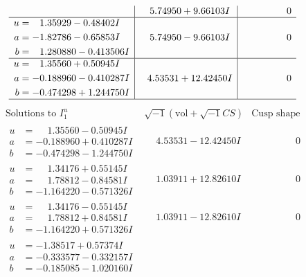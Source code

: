 \documentclass[1p]{elsarticle_modified}
\theoremstyle{definition}
\newcommand{\I}{\sqrt{-1}}
\begin{document}
$$\begin{array}{c|c|c}
 & \phantom{-}5.74950 + 9.66103 I & \phantom{-0.000000 } 0 \\ \hline\begin{aligned}
u &= \phantom{-}1.35929 - 0.48402 I \\
a &= -1.82786 - 0.65853 I \\
b &= \phantom{-}1.280880 - 0.413506 I\end{aligned}
 & \phantom{-}5.74950 - 9.66103 I & \phantom{-0.000000 } 0 \\ \hline\begin{aligned}
u &= \phantom{-}1.35560 + 0.50945 I \\
a &= -0.188960 - 0.410287 I \\
b &= -0.474298 + 1.244750 I\end{aligned}
 & \phantom{-}4.53531 + 12.42450 I & \phantom{-0.000000 } 0\\
 \hline 
 \end{array}$$\newpage$$\begin{array}{c|c|c}  
\text{Solutions to }I^u_{1}& \I (\text{vol} + \sqrt{-1}CS) & \text{Cusp shape}\\
 \hline 
\begin{aligned}
u &= \phantom{-}1.35560 - 0.50945 I \\
a &= -0.188960 + 0.410287 I \\
b &= -0.474298 - 1.244750 I\end{aligned}
 & \phantom{-}4.53531 - 12.42450 I & \phantom{-0.000000 } 0 \\ \hline\begin{aligned}
u &= \phantom{-}1.34176 + 0.55145 I \\
a &= \phantom{-}1.78812 - 0.84581 I \\
b &= -1.164220 - 0.571326 I\end{aligned}
 & \phantom{-}1.03911 + 12.82610 I & \phantom{-0.000000 } 0 \\ \hline\begin{aligned}
u &= \phantom{-}1.34176 - 0.55145 I \\
a &= \phantom{-}1.78812 + 0.84581 I \\
b &= -1.164220 + 0.571326 I\end{aligned}
 & \phantom{-}1.03911 - 12.82610 I & \phantom{-0.000000 } 0 \\ \hline\begin{aligned}
u &= -1.38517 + 0.57374 I \\
a &= -0.333577 - 0.332157 I \\
b &= -0.185085 - 1.020160 I\end{aligned}

\end{array}$$
\end{document}
